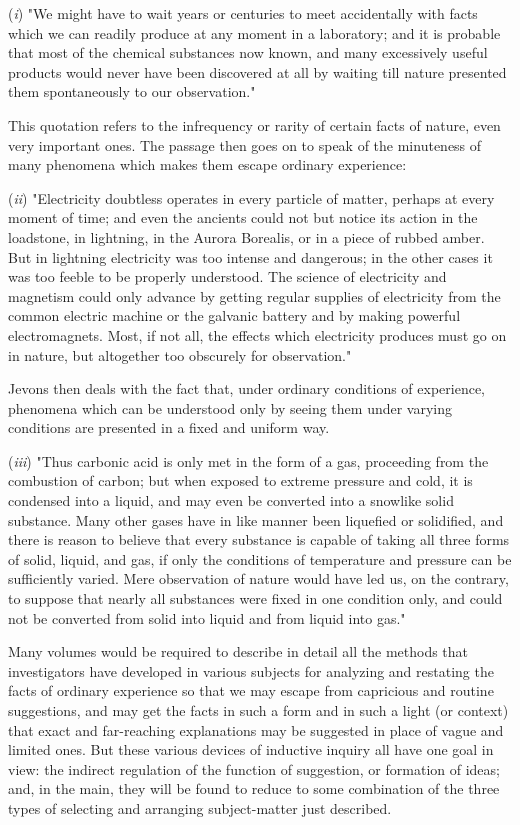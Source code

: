 \documentclass[showtrims,ustradepaper]{memoir}
\begin{document}
(\emph{i}) "We might have to wait years or centuries to
meet
accidentally with facts which we can readily produce at any moment in a
laboratory; and it is probable that most of the chemical substances now
known, and many excessively useful products would never have been
discovered at all by waiting till nature presented them spontaneously to
our observation."

This quotation refers to the infrequency or rarity of certain facts of
nature, even very important ones. The passage then goes on to speak of
the minuteness of many phenomena which makes them escape ordinary
experience:

(\emph{ii}) "Electricity doubtless operates in every particle of matter,
perhaps at every moment of time; and even the ancients could not but
notice its action in the loadstone, in lightning, in the Aurora
Borealis, or in a piece of rubbed amber. But in lightning electricity
was too intense and dangerous; in the other cases it was too feeble to
be properly understood. The science of electricity and magnetism could
only advance by getting regular supplies of electricity from the common
electric machine or the galvanic battery and by making powerful
electromagnets. Most, if not all, the effects which electricity produces
must go on in nature, but altogether too obscurely for observation."

Jevons then deals with the fact that, under ordinary conditions of
experience, phenomena which can be understood only by seeing them under
varying conditions are presented in a fixed and uniform way.

(\emph{iii}) "Thus carbonic acid is only met in the form of a gas,
proceeding from the combustion of carbon; but when exposed to extreme
pressure and cold, it is condensed into a liquid, and may even be
converted into a snowlike solid substance. Many other gases have
in
like manner been liquefied or solidified, and there is reason to believe
that every substance is capable of taking all three forms of solid,
liquid, and gas, if only the conditions of temperature and pressure can
be sufficiently varied. Mere observation of nature would have led us, on
the contrary, to suppose that nearly all substances were fixed in one
condition only, and could not be converted from solid into liquid and
from liquid into gas."

Many volumes would be required to describe in detail all the methods
that investigators have developed in various subjects for analyzing and
restating the facts of ordinary experience so that we may escape from
capricious and routine suggestions, and may get the facts in such a form
and in such a light (or context) that exact and far-reaching
explanations may be suggested in place of vague and limited ones. But
these various devices of inductive inquiry all have one goal in view:
the indirect regulation of the function of suggestion, or formation of
ideas; and, in the main, they will be found to reduce to some
combination of the three types of selecting and arranging subject-matter
just described.
\end{document}
